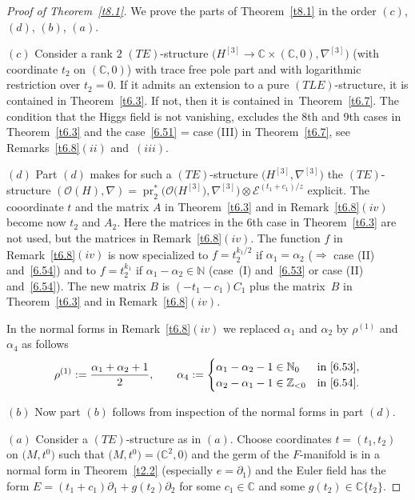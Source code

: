 \documentclass[pdftex]{sigma}%
\numberwithin{equation}{section}
\numberwithin{figure}{section}
\newcommand{\N}{{\mathbb N}}
\newcommand{\Z}{{\mathbb Z}}
\newcommand{\C}{{\mathbb C}}
\newcommand{\EE}{{\mathcal E}}
\newcommand{\OO}{{\mathcal O}}
\newcommand{\paa}{\partial}
\newcommand{\nnn}{\nabla}
\DeclareMathOperator{\pr}{pr}
\begin{document}
\begin{proof}[Proof of Theorem~\ref{t8.1}]
We prove the parts of Theorem~\ref{t8.1}
in the order $(c)$, $(d)$, $(b)$, $(a)$.

$(c)$ Consider a rank $2$ $(TE)$-structure
$\big(H^{[3]}\to\C\times(\C,0),\nnn^{[3]}\big)$
(with coordinate $t_2$ on $(\C,0)$)
with trace free pole part and with logarithmic
restriction over $t_2=0$. If it admits an
extension to a pure $(TLE)$-structure, it is contained in Theo\-rem~\ref{t6.3}. If not, then it is contained in~Theorem~\ref{t6.7}. The condition that the Higgs field
is not vanishing, excludes the 8th and 9th cases in Theo\-rem~\ref{t6.3} and the case~\eqref{6.51} = case (III)
in Theorem~\ref{t6.7}, see Remarks~\ref{t6.8}$(ii)$ and~$(iii)$.

$(d)$ Part $(d)$ makes for such a $(TE)$-structure
$\big(H^{[3]},\nnn^{[3]}\big)$ the $(TE)$-structure
$(\OO(H),\nnn)=\pr_2^*\big(\OO\big(H^{[3]}\big),\nnn^{[3]}\big)\otimes
\EE^{(t_1+c_1)/z}$ explicit.
The cooordinate $t$ and the matrix $A$ in Theorem~\ref{t6.3}
and in Remark~\ref{t6.8}$(iv)$ become now $t_2$ and $A_2$.
Here the matrices in the 6th case in Theorem~\ref{t6.3}
are not used, but the matrices in Remark~\ref{t6.8}$(iv)$.
The function $f$ in Remark~\ref{t6.8}$(iv)$ is now
specialized to $f=t_2^{k_1/2}$ if $\alpha_1=\alpha_2$
($\Rightarrow$ case (II) and~\eqref{6.54})
and to $f=t_2^{k_1}$ if $\alpha_1-\alpha_2\in\N$
(case~(I) and~\eqref{6.53} or case (II) and~\eqref{6.54}).
The new matrix $B$ is $(-t_1-c_1)C_1$ plus the matrix~$B$ in Theorem~\ref{t6.3} and in Remark~\ref{t6.8}$(iv)$.

In the normal forms in Remark~\ref{t6.8}$(iv)$ we replaced
$\alpha_1$ and $\alpha_2$ by $\rho^{(1)}$ and $\alpha_4$
as follows
\begin{gather*}%
\rho^{(1)}:=\frac{\alpha_1+\alpha_2+1}{2},\qquad
\alpha_4:=\begin{cases}
\alpha_1-\alpha_2-1\in\N_0&\text{in}~\eqref{6.53},
\\
\alpha_2-\alpha_1-1\in\Z_{<0}&\text{in}~\eqref{6.54}.
\end{cases}
\end{gather*}

$(b)$ Now part $(b)$ follows from inspection of the normal forms
in part $(d)$.

$(a)$ Consider a $(TE)$-structure
as in $(a)$. Choose coordinates $t=(t_1,t_2)$ on $\big(M,t^0\big)$
such that $\big(M,t^0\big)=\big(\C^2,0\big)$ and the germ of the $F$-manifold
is in a normal form in Theorem~\ref{t2.2}
(especially $e=\paa_1$)
and the Euler field has the form $E=(t_1+c_1)\paa_1
+g(t_2)\paa_2$ for some $c_1\in\C$ and some
$g(t_2)\in\C\{t_2\}$.


\end{proof}
\end{document}
